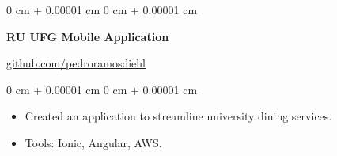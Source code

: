 \documentclass[10pt, letterpaper]{article}
\newenvironment{highlights}{
    \begin{itemize}[
        topsep=0.10 cm,
        parsep=0.10 cm,
        partopsep=0pt,
        itemsep=0pt,
        leftmargin=0 cm + 10pt
    ]
}{
    \end{itemize}
} %
\newenvironment{onecolentry}{
    \begin{adjustwidth}{
        0 cm + 0.00001 cm
    }{
        0 cm + 0.00001 cm
    }
}{
    \end{adjustwidth}
} %
\newenvironment{twocolentry}[2][]{
    \onecolentry
    \def\secondColumn{#2}
    \setcolumnwidth{\fill, 4.5 cm}
    \begin{paracol}{2}
}{
    \switchcolumn \raggedleft \secondColumn
    \end{paracol}
    \endonecolentry
} %
\begin{document}
        \vspace{0.2 cm}

        \begin{twocolentry}{
            \href{https://github.com/pedroramosdiehl}{github.com/pedroramosdiehl}
        }
            \textbf{RU UFG Mobile Application}
        \end{twocolentry}
        \vspace{0.10 cm}
        \begin{onecolentry}
            \begin{highlights}
                \item Created an application to streamline university dining services.
                \item Tools: Ionic, Angular, AWS.
            \end{highlights}
        \end{onecolentry}
\end{document}
